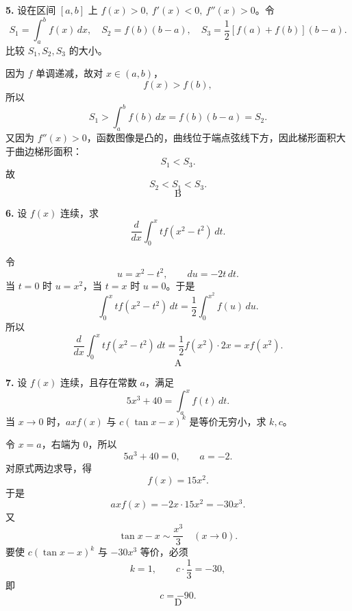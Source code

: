 \begin{problemblock}
\textbf{5.} 设在区间 \([a,b]\) 上 \(f(x)>0,\ f'(x)<0,\ f''(x)>0\)。令
\[
S_1=\int_a^b f(x)\,dx,\quad
S_2=f(b)(b-a),\quad
S_3=\frac12[f(a)+f(b)](b-a).
\]
比较 \(S_1,S_2,S_3\) 的大小。
\end{problemblock}

\begin{solutionblock}
因为 \(f\) 单调递减，故对 \(x\in(a,b)\)，
\[
f(x)>f(b),
\]
所以
\[
S_1>\int_a^b f(b)\,dx=f(b)(b-a)=S_2.
\]
又因为 \(f''(x)>0\)，函数图像是凸的，曲线位于端点弦线下方，因此梯形面积大于曲边梯形面积：
\[
S_1<S_3.
\]
故
\[
S_2<S_1<S_3.
\]
\[
\boxed{\text{B}}
\]
\end{solutionblock}

\begin{problemblock}
\textbf{6.} 设 \(f(x)\) 连续，求
\[
\frac{d}{dx}\int_0^x t f(x^2-t^2)\,dt.
\]
\end{problemblock}

\begin{solutionblock}
令
\[
u=x^2-t^2,\qquad du=-2t\,dt.
\]
当 \(t=0\) 时 \(u=x^2\)，当 \(t=x\) 时 \(u=0\)。于是
\[
\int_0^x t f(x^2-t^2)\,dt
=\frac12\int_0^{x^2}f(u)\,du.
\]
所以
\[
\frac{d}{dx}\int_0^x t f(x^2-t^2)\,dt
=\frac12 f(x^2)\cdot 2x
=xf(x^2).
\]
\[
\boxed{\text{A}}
\]
\end{solutionblock}

\begin{problemblock}
\textbf{7.} 设 \(f(x)\) 连续，且存在常数 \(a\)，满足
\[
5x^3+40=\int_a^x f(t)\,dt.
\]
当 \(x\to0\) 时，\(axf(x)\) 与 \(c(\tan x-x)^k\) 是等价无穷小，求 \(k,c\)。
\end{problemblock}

\begin{solutionblock}
令 \(x=a\)，右端为 \(0\)，所以
\[
5a^3+40=0,\qquad a=-2.
\]
对原式两边求导，得
\[
f(x)=15x^2.
\]
于是
\[
axf(x)=-2x\cdot15x^2=-30x^3.
\]
又
\[
\tan x-x\sim \frac{x^3}{3}\quad(x\to0).
\]
要使 \(c(\tan x-x)^k\) 与 \(-30x^3\) 等价，必须
\[
k=1,\qquad c\cdot\frac13=-30,
\]
即
\[
c=-90.
\]
\[
\boxed{\text{D}}
\]
\end{solutionblock}

